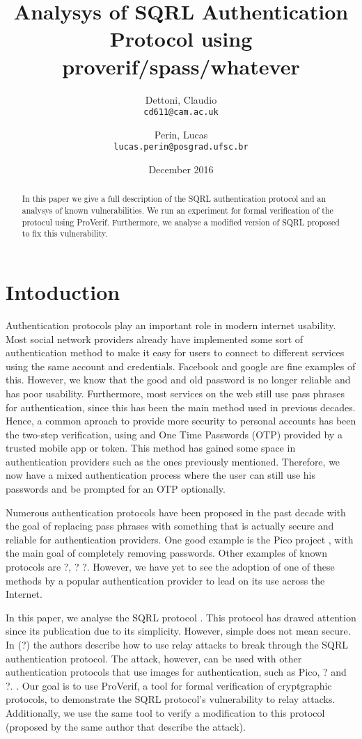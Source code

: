 \documentclass{article}
\title{Analysys of SQRL Authentication Protocol using proverif/spass/whatever}
\author{Dettoni, Claudio\\
	\texttt{cd611@cam.ac.uk}
	\and
	Perin, Lucas\\
	\texttt{lucas.perin@posgrad.ufsc.br}
}
\date{December 2016}
\begin{document}
\maketitle

\begin{abstract}
	In this paper we give a full description of the SQRL authentication
	protocol and an analysys of known vulnerabilities. We run an 
	experiment for formal verification of the protocul using ProVerif.
	Furthermore, we analyse a modified version of SQRL proposed to fix
	this vulnerability.
\end{abstract}

\section{Intoduction}
	Authentication protocols play an important role in modern internet
	usability. Most social network providers already have implemented
	some sort of authentication method to make it easy for users to connect
	to different services using the same account and credentials. Facebook 
	and google are fine examples of this. However, we know that the good and 
	old password is no longer reliable and has poor usability. 
	Furthermore, most services on the web still use pass phrases for authentication,
	since this has been the main method used in previous decades. Hence,
	a common aproach to provide more security to personal accounts has 
	been the two-step verification, using and One Time Passwords (OTP) 
	provided by a trusted mobile app or token. This	method has gained some 
	space in authentication providers such as the
	ones previously mentioned. Therefore, we now have a mixed authentication process
	where the user can still use his passwords and be prompted for an
	OTP optionally.

	Numerous authentication protocols have been proposed in the past
	decade with the goal of replacing pass phrases with something that
	is actually secure and reliable for authentication providers. One
	good example is the Pico project , with the main goal of
	completely removing passwords. Other examples of known protocols are ?, ? ?.  
	However, we have yet to see the adoption of one of these methods
	by a popular authentication provider to lead on its use across the
	Internet. 

	In this paper, we analyse the SQRL protocol . This protocol
	has drawed attention since its publication due to its simplicity. However,
	simple does not mean secure. In (?) the authors
	describe how to use relay attacks to break through the SQRL authentication
	protocol. The attack, however, can be used with other authentication
	protocols that use images for authentication, such as Pico, ? and ?. .
	Our goal is to use ProVerif, a tool for formal verification of cryptgraphic
	protocols, to demonstrate the SQRL protocol's vulnerability to relay attacks.
	Additionally, we use the same tool to verify a modification to this protocol 
	(proposed by the same author that describe the attack). 
\end{document}
